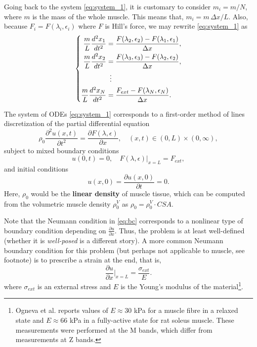 \documentclass{nmlreport}
\begin{document}
{Going back to the system \eqref{eq:system_1}, it is customary to consider $m_i = m/N$, where $m$ is the mass of the whole muscle. This means that, $m_i = m \, \Delta x / L$. Also, because $F_i = F(\lambda_i,\epsilon_i)$ where $F$ is Hill's force, we may rewrite \eqref{eq:system_1} as
\begin{equation} \label{eq:system_2}
	\left\{ 
		\begin{aligned}
			\dfrac{m}{L} \dfrac{d^2 x_1}{dt^2} &= \dfrac{F(\lambda_2,\epsilon_2) - F(\lambda_1,\epsilon_1)}{\Delta x}, \\
			\dfrac{m}{L} \dfrac{d^2 x_2}{dt^2} &= \dfrac{F(\lambda_3,\epsilon_3) - F(\lambda_2,\epsilon_2)}{\Delta x}, \\
			&\hspace{0.5em} \vdots \\
			\dfrac{m}{L} \dfrac{d^2 x_N}{dt^2} &= \dfrac{F_{ext} - F(\lambda_N,\epsilon_N)}{\Delta x}.
		\end{aligned} 
	\right.
\end{equation}

\begin{claim}
	The system of ODEs \eqref{eq:system_1} corresponds to a first-order method of lines discretization of the partial differential equation
	\begin{equation} \label{eq:pde}
		\rho_0 \dfrac{\partial^2 u(x,t)}{\partial t^2} = \dfrac{\partial F(\lambda,\epsilon)}{\partial x}, \quad (x,t) \in (0,L) \times (0,\infty),
	\end{equation}
	subject to mixed boundary conditions
	\begin{equation} \label{eq:bc}
		u(0,t) = 0, \quad F(\lambda,\epsilon)\big|_{x=L} = F_{ext},
	\end{equation}
	and initial conditions
	\begin{equation}
		u(x,0) = \dfrac{\partial u(x,0)}{\partial t} = 0.
	\end{equation}
	Here, $\rho_0$ would be the \textbf{linear density} of muscle tissue, which can be computed from the volumetric muscle density $\rho_0^V$ as $\rho_0 = \rho_0^V \cdot CSA$.
\end{claim}

Note that the Neumann condition in \eqref{eq:bc} corresponds to a nonlinear type of boundary condition depending on $\frac{\partial u}{\partial x}$. Thus, the problem is at least well-defined (whether it is \textit{well-posed} is a different story). A more common Neumann boundary condition for this problem (but perhaps not applicable to muscle, see footnote) is to prescribe a strain at the end, that is,
\[
	\dfrac{\partial u}{\partial x}\Big|_{x=L} = \dfrac{\sigma_{ext}}{E}.
\]
where $\sigma_{ext}$ is an external stress and $E$ is the Young's modulus of the material\footnote{Ogneva et al. \cite{OgnevaEtAl2010} reports values of $E \approx 30$ kPa for a muscle fibre in a relaxed state and $E \approx 66$ kPa in a fully-active state for rat soleus muscle. These measurements were performed at the M bands, which differ from measurements at Z bands.}.

}
\end{document}
